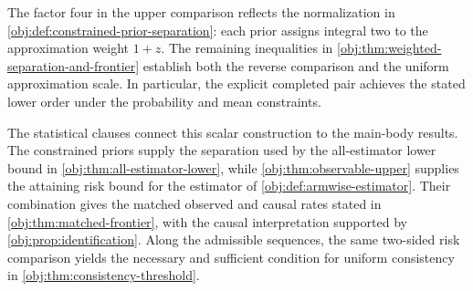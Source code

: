 The factor four in the upper comparison reflects the normalization in \cref{obj:def:constrained-prior-separation}: each prior assigns integral two to the approximation weight \(1+z\). The remaining inequalities in \cref{obj:thm:weighted-separation-and-frontier} establish both the reverse comparison and the uniform approximation scale. In particular, the explicit completed pair achieves the stated lower order under the probability and mean constraints.

The statistical clauses connect this scalar construction to the main-body results. The constrained priors supply the separation used by the all-estimator lower bound in \cref{obj:thm:all-estimator-lower}, while \cref{obj:thm:observable-upper} supplies the attaining risk bound for the estimator of \cref{obj:def:armwise-estimator}. Their combination gives the matched observed and causal rates stated in \cref{obj:thm:matched-frontier}, with the causal interpretation supported by \cref{obj:prop:identification}. Along the admissible sequences, the same two-sided risk comparison yields the necessary and sufficient condition for uniform consistency in \cref{obj:thm:consistency-threshold}.
